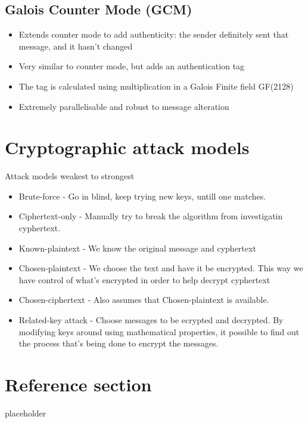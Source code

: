 \documentclass{article}
\begin{document}
\subsection{Galois Counter Mode (GCM)}
\begin{itemize}
  \item Extends counter mode to add authenticity: the sender definitely sent that message, and it hasn’t changed 
  \item Very similar to counter mode, but adds an authentication tag 
  \item The tag is calculated using multiplication in a Galois Finite field GF(2128) 
  \item Extremely parallelisable and robust to message alteration
\end{itemize}

\section{Cryptographic attack models}
\begin{flushleft}
Attack models weakest to strongest
\end{flushleft}
\begin{itemize}
  \item Brute-force - Go in blind, keep trying new keys, untill one matches.
  \item Ciphertext-only - Manually try to break the algorithm from investigatin cyphertext.
  \item Known-plaintext - We know the original message and cyphertext
  \item Chosen-plaintext - We choose the text and have it be encrypted. This way we have control of what's encrypted in order to help decrypt cyphertext
  \item Chosen-ciphertext - Also assumes that Chosen-plaintext is available.
  \item Related-key attack - Choose messages to be ecrypted and decrypted. By modifying keys around using mathematical properties, it possible to find out the process that's being done to encrypt the messages.
\end{itemize}

\pagebreak
\section*{Reference section} \label{sec:reference}
\begin{description}
	\item[placeholder] \hfill \\
\end{description}
\end{document}
